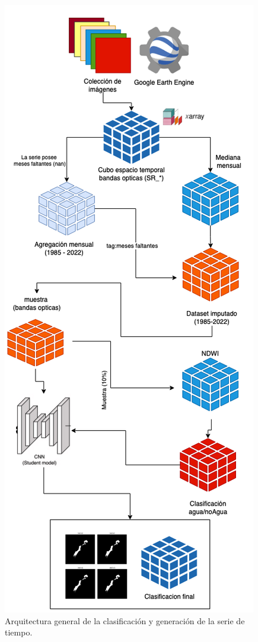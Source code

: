 \begin{figure}
	\centering
	\includegraphics[scale=.6]{Figures/Arqui_TTFBv3.png}
	\caption{Arquitectura general de la clasificación y generación de la serie de tiempo.}
	\label{fig:arquitectura_general}
\end{figure}

